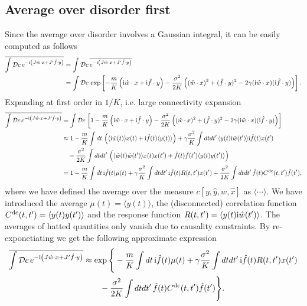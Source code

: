 \documentclass[
    preprint,
    linenumbers,
    amsmath,amssymb,amsfonts,
    aps, physrev,
    superscriptaddress,
    10pt,
    bibnotes
    ]{revtex4-2}
\begin{document}
\subsection*{Average over disorder first}
Since the average over disorder involves a Gaussian integral, it can be easily computed as follows
\begin{align}
  \overline{\int \mathcal{D}c \, e^{-{\rm i}\left(J \hat{w}\cdot x+J'\hat{f}\cdot y\right)}}&=\int \mathcal{D}c \, \overline{e^{-{\rm i}\left(J \hat{w}\cdot x+J'\hat{f}\cdot y\right)}}\\
  &=\int \mathcal{D}c\,\exp\left[-\frac{m}{K}\left({\rm i}\hat{w}\cdot x+ {\rm i}\hat{f}\cdot y \right)-\frac{\sigma^2}{2K}\left( (\hat{w}\cdot x)^2+(\hat{f}\cdot y)^2 - 2\gamma ({\rm i}\hat{w}\cdot x) ({\rm i}\hat{f}\cdot y) \right) \right].
\end{align}
Expanding at first order in $1/K$, i.e. large connectivity expansion
\begin{align}
  \overline{\int \mathcal{D}c \, e^{-{\rm i}\left(J \hat{w}\cdot x+J'\hat{f}\cdot y\right)}}&=\int \mathcal{D}c \,\left[1 - \frac{m}{K}\left({\rm i}\hat{w}\cdot x+ {\rm i}\hat{f}\cdot y \right)-\frac{\sigma^2}{2K}\left( (\hat{w}\cdot x)^2+(\hat{f}\cdot y)^2 - 2\gamma ({\rm i}\hat{w}\cdot x) ({\rm i}\hat{f}\cdot y) \right)\right]\\
  &\approx 1 - \frac{m}{K}\int dt\, \left(\langle{\rm i} \hat{w}(t)\rangle x(t)+ {\rm i}\hat{f}(t) \langle y(t)\rangle \right)+\gamma\frac{\sigma^2}{K} \int dt dt'\,\langle y(t){\rm i}\hat{w}(t')\rangle {\rm i}\hat{f}(t)x(t')\nonumber\\
  &\quad - \frac{\sigma^2}{2K} \int dt dt'\,\left(\langle \hat{w}(t)\hat{w}(t')\rangle x(t)x(t')+\hat{f}(t)\hat{f}(t')\langle y(t)y(t')\rangle \right)\\
  &= 1 - \frac{m}{K}\int dt\, {\rm i}\hat{f}(t) \mu(t) +\gamma\frac{\sigma^2}{K} \int dt dt'\,{\rm i}\hat{f}(t) R(t,t') x(t') - \frac{\sigma^2}{2K} \int dt dt'\, \hat{f}(t)C^{\rm dc}(t,t')\hat{f}(t'),
\end{align}
where we have defined the average over the measure $c[y,\hat{y},w,\hat{x}]$ as $\langle \cdots \rangle$. We have introduced the average $\mu(t)=\langle y(t)\rangle$, the (disconnected) correlation function $C^{\rm dc}(t,t')=\langle y(t)y(t')\rangle$ and the response function $R(t,t')=\langle y(t){\rm i}\hat{w}(t')\rangle$. The averages of hatted quantities only vanish due to causality constraints.
By re-exponetiating we get the following approximate expression
\begin{align}
  \overline{\int \mathcal{D}c \, e^{-{\rm i}\left(J \hat{w}\cdot x+J'\hat{f}\cdot y\right)}} &\approx \exp\Bigg\{ - \frac{m}{K}\int dt\, {\rm i}\hat{f}(t) \mu(t) +\gamma\frac{\sigma^2}{K} \int dt dt'\,{\rm i}\hat{f}(t) R(t,t') x(t')\nonumber\\
  &\qquad - \frac{\sigma^2}{2K} \int dt dt'\, \hat{f}(t)C^{\rm dc}(t,t')\hat{f}(t') \Bigg\}.
\end{align}
\end{document}
